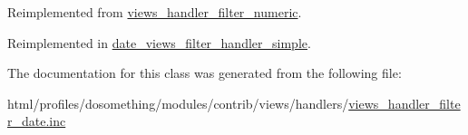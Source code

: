 Reimplemented from \hyperlink{classviews__handler__filter__numeric_ab0888218590f7c620f10fc04a98d135e}{views\_\-handler\_\-filter\_\-numeric}.

Reimplemented in \hyperlink{classdate__views__filter__handler__simple_a59232ef0a63cc9cf0a4a702ea6b06f12}{date\_\-views\_\-filter\_\-handler\_\-simple}.

The documentation for this class was generated from the following file:\begin{DoxyCompactItemize}
\item 
html/profiles/dosomething/modules/contrib/views/handlers/\hyperlink{views__handler__filter__date_8inc}{views\_\-handler\_\-filter\_\-date.inc}\end{DoxyCompactItemize}

